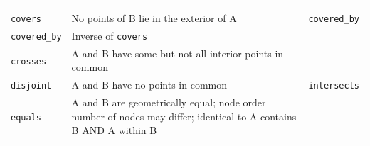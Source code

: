 \documentclass[]{book}
\begin{document}
\begin{longtable}[]{@{}lll@{}}
\begin{minipage}[t]{0.13\columnwidth}
\strut
\end{minipage}\tabularnewline
\begin{minipage}[t]{0.23\columnwidth}\raggedright
\texttt{covers}\strut
\end{minipage} & \begin{minipage}[t]{0.54\columnwidth}\raggedright
No points of B lie in the exterior of A\strut
\end{minipage} & \begin{minipage}[t]{0.13\columnwidth}\raggedright
\texttt{covered\_by}\strut
\end{minipage}\tabularnewline
\begin{minipage}[t]{0.23\columnwidth}\raggedright
\texttt{covered\_by}\strut
\end{minipage} & \begin{minipage}[t]{0.54\columnwidth}\raggedright
Inverse of \texttt{covers}\strut
\end{minipage} & \begin{minipage}[t]{0.13\columnwidth}\raggedright
\strut
\end{minipage}\tabularnewline
\begin{minipage}[t]{0.23\columnwidth}\raggedright
\texttt{crosses}\strut
\end{minipage} & \begin{minipage}[t]{0.54\columnwidth}\raggedright
A and B have some but not all interior points in common\strut
\end{minipage} & \begin{minipage}[t]{0.13\columnwidth}\raggedright
\strut
\end{minipage}\tabularnewline
\begin{minipage}[t]{0.23\columnwidth}\raggedright
\texttt{disjoint}\strut
\end{minipage} & \begin{minipage}[t]{0.54\columnwidth}\raggedright
A and B have no points in common\strut
\end{minipage} & \begin{minipage}[t]{0.13\columnwidth}\raggedright
\texttt{intersects}\strut
\end{minipage}\tabularnewline
\begin{minipage}[t]{0.23\columnwidth}\raggedright
\texttt{equals}\strut
\end{minipage} & \begin{minipage}[t]{0.54\columnwidth}\raggedright
A and B are geometrically equal; node order number of nodes may differ; identical to A contains B AND A within B\strut

\end{minipage}
\end{longtable}
\end{document}
